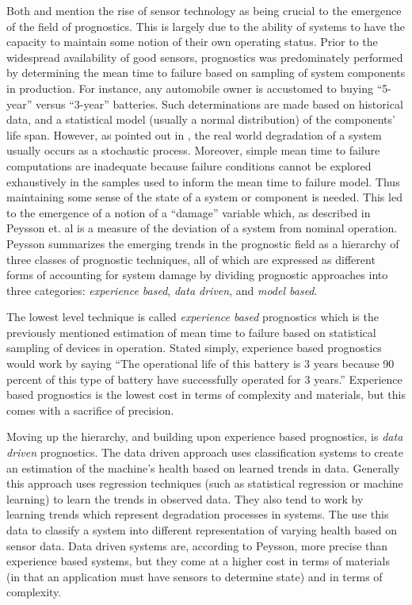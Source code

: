\documentclass[12pt]{article}
\begin{document}
Both \cite{877920} and \cite{4585821} mention the rise of sensor
technology as being crucial to the emergence of the field of
prognostics.  This is largely due to the ability of systems to have
the capacity to maintain some notion of their own operating status.
Prior to the widespread availability of good sensors, prognostics was
predominately performed by determining the mean time to failure based
on sampling of system components in production.  For instance, any
automobile owner is accustomed to buying ``5-year'' versus ``3-year''
batteries.  Such determinations are made based on historical data, and
a statistical model (usually a normal distribution) of the components'
life span.  However, as pointed out in \cite{4711428}, the real world
degradation of a system usually occurs as a stochastic process.
Moreover, simple mean time to failure computations are inadequate
because failure conditions cannot be explored exhaustively in the
samples used to inform the mean time to failure model.  Thus
maintaining some sense of the state of a system or component is
needed.  This led to the emergence of a notion of a ``damage''
variable which, as described in Peysson et. al \cite{4711428} is a
measure of the deviation of a system from nominal operation.  Peysson
summarizes the emerging trends in the prognostic field as a hierarchy
of three classes of prognostic techniques, all of which are expressed
as different forms of accounting for system damage by dividing
prognostic approaches into three categories: {\em experience based},
  {\em data driven}, and {\em model based}.

The lowest level technique is called {\em experience based}
prognostics which is the previously mentioned estimation of mean time
to failure based on statistical sampling of devices in operation.
Stated simply, experience based prognostics would work by saying ``The
operational life of this battery is 3 years because 90 percent of this
type of battery have successfully operated for 3 years.''  Experience
based prognostics is the lowest cost in terms of complexity and
materials, but this comes with a sacrifice of precision.

Moving up the hierarchy, and building upon experience based
prognostics, is {\em data driven} prognostics.  The data driven
approach uses classification systems to create an estimation of the
machine's health based on learned trends in data.  Generally this
approach uses regression techniques (such as statistical regression or
machine learning) to learn the trends in observed data.  They also
tend to work by learning trends which represent degradation processes
in systems.  The use this data to classify a system into different
representation of varying health based on sensor data.  Data driven
systems are, according to Peysson, more precise than experience based
systems, but they come at a higher cost in terms of materials (in that
an application must have sensors to determine state) and in terms of
complexity.
\end{document}
